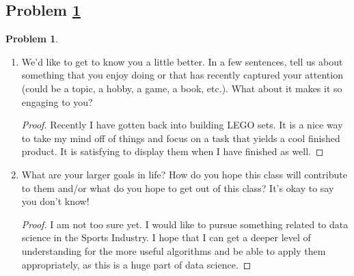 \documentclass[11pt]{article}
\theoremstyle{definition}
\theoremstyle{definition}
\newtheorem{required}{Problem}
\theoremstyle{definition}
\begin{document}
\subsection{Problem \ref{Math}}
\begin{required} \label{Math}

\renewcommand{\theenumi}{\alph{enumi}}
\begin{enumerate}

\item We'd like to get to know you a little better. In a few sentences, tell us about something that you enjoy doing or that has recently captured your attention (could be a topic, a hobby, a game, a book, etc.). What about it makes it so engaging to you?

\begin{proof}
Recently I have gotten back into building LEGO sets. It is a nice way to take my mind off of things and focus on a task that yields a cool finished product. It is satisfying to display them when I have finished as well. 
\end{proof}

\item What are your larger goals in life? How do you hope this class will contribute to them and/or what do you hope to get out of this class? It's okay to say you don't know! 

\begin{proof}
I am not too sure yet. I would like to pursue something related to data science in the Sports Industry. I hope that I can get a deeper level of understanding for the more useful algorithms and be able to apply them appropriately, as this is a huge part of data science. 
\end{proof}
\end{enumerate}

\end{required}

\end{document}
